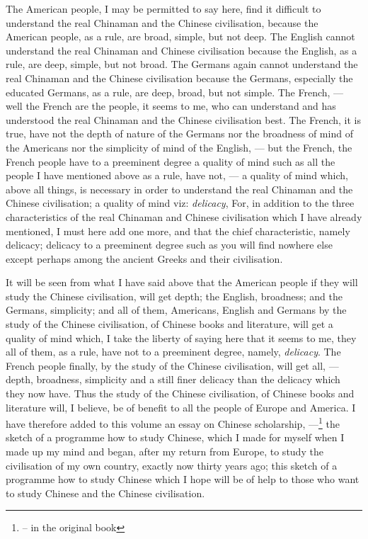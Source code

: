 The American people, I may be permitted to say here, find it difficult to understand the real Chinaman and the Chinese civilisation, because the American people, as a rule, are broad, simple, but not deep.
The English cannot understand the real Chinaman and Chinese civilisation because the English, as a rule, are deep, simple, but not broad.
The Germans again cannot understand the real Chinaman and the Chinese civilisation because the Germans, especially the educated Germans, as a rule, are deep, broad, but not simple.
The French, --- well the French are the people, it seems to me, who can understand and has understood the real Chinaman and the Chinese civilisation best\cite{num2}. 
The French, it is true, have not the depth of nature of the Germans nor the broadness of mind of the Americans nor the simplicity of mind of the English, --- but the French, the French people have to a preeminent  degree a quality of mind such as all the people I have mentioned above as a rule, have not, --- a quality of mind which, above all things, is necessary in order to understand the real Chinaman and the Chinese civilisation; a quality of mind viz: \emph{delicacy}, For, in addition to the three characteristics of the real Chinaman and Chinese civilisation which I have already mentioned, I must here add one more, and that the chief characteristic, namely delicacy; delicacy to a preeminent  degree such as you will find nowhere else except perhaps among the ancient Greeks and their civilisation.

It will be seen from what I have said above that the American people if they will study the Chinese civilisation, will get depth; the English, broadness; and the Germans, simplicity; and all of them, Americans, English and Germans by the study of the Chinese civilisation, of Chinese books and literature,  will get a quality of mind which, I take the liberty of saying here that it seems to me, they all of them, as a rule, have not to a preeminent degree, namely, \emph{delicacy}.
The French people finally, by the study of the Chinese civilisation, will get all, --- depth, broadness, simplicity and a still finer delicacy than the delicacy which they now have.
Thus the study of the Chinese civilisation, of Chinese books and literature will, I believe, be of benefit to all the people of Europe and America.
I have therefore added to this volume an essay on Chinese scholarship, ---\footnote{-- in the original book} the sketch of a programme how to study Chinese, which I made for myself when I made up my mind and began, after my return from Europe, to study the civilisation of my own country, exactly now thirty years ago; this sketch of a programme how to study Chinese which I hope will be of help to those who want to study Chinese and the Chinese civilisation.


